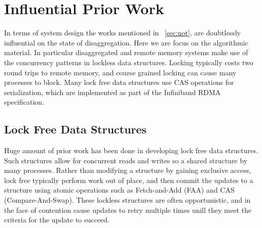   
  
\section{Influential Prior Work}

In terms of system design the works mentioned in ~\ref{sec:not}, are doubtlessly
influential on the state of disaggregation. Here we are focus on the algorithmic
material. In particular disaggregated and remote memory systems make use of the
concurrency patterns in lockless data structures. Locking typically costs two
round trips to remote memory, and course grained locking can cause many
processes to block. Many lock free data structures use CAS operations for
serialization, which are implemented as part of the Infiniband RDMA
specification.

\subsection{Lock Free Data Structures}

Huge amount of prior work has been done in developing lock free data structures.
Such structures allow for concurrent reads and writes so a shared structure by
many processes. Rather than modifying a structure by gaining exclusive access,
lock free typically perform work out of place, and then commit the updates to a
structure using atomic operations such as Fetch-and-Add (FAA) and CAS
(Compare-And-Swap). These lockless structures are often opportunistic, and in
the face of contention cause updates to retry multiple times unill they meet the
criteria for the update to succeed.

